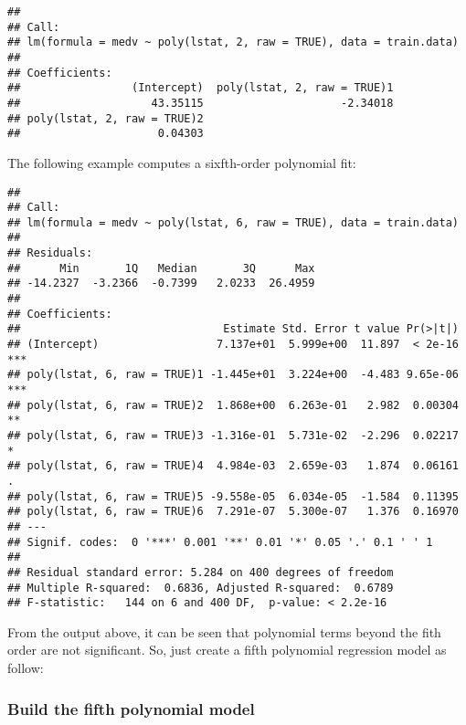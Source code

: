 \documentclass[]{article}
\newenvironment{Shaded}{\begin{snugshade}}{\end{snugshade}}
\newcommand{\DataTypeTok}[1]{\textcolor[rgb]{0.13,0.29,0.53}{#1}}
\newcommand{\DecValTok}[1]{\textcolor[rgb]{0.00,0.00,0.81}{#1}}
\newcommand{\KeywordTok}[1]{\textcolor[rgb]{0.13,0.29,0.53}{\textbf{#1}}}
\newcommand{\NormalTok}[1]{#1}
\newcommand{\OperatorTok}[1]{\textcolor[rgb]{0.81,0.36,0.00}{\textbf{#1}}}
\newcommand{\OtherTok}[1]{\textcolor[rgb]{0.56,0.35,0.01}{#1}}
\newcommand{\StringTok}[1]{\textcolor[rgb]{0.31,0.60,0.02}{#1}}
\begin{document}
\begin{verbatim}
## 
## Call:
## lm(formula = medv ~ poly(lstat, 2, raw = TRUE), data = train.data)
## 
## Coefficients:
##                 (Intercept)  poly(lstat, 2, raw = TRUE)1  
##                    43.35115                     -2.34018  
## poly(lstat, 2, raw = TRUE)2  
##                     0.04303
\end{verbatim}

The following example computes a sixfth-order polynomial fit:

\begin{Shaded}
\end{Shaded}

\begin{verbatim}
## 
## Call:
## lm(formula = medv ~ poly(lstat, 6, raw = TRUE), data = train.data)
## 
## Residuals:
##      Min       1Q   Median       3Q      Max 
## -14.2327  -3.2366  -0.7399   2.0233  26.4959 
## 
## Coefficients:
##                               Estimate Std. Error t value Pr(>|t|)    
## (Intercept)                  7.137e+01  5.999e+00  11.897  < 2e-16 ***
## poly(lstat, 6, raw = TRUE)1 -1.445e+01  3.224e+00  -4.483 9.65e-06 ***
## poly(lstat, 6, raw = TRUE)2  1.868e+00  6.263e-01   2.982  0.00304 ** 
## poly(lstat, 6, raw = TRUE)3 -1.316e-01  5.731e-02  -2.296  0.02217 *  
## poly(lstat, 6, raw = TRUE)4  4.984e-03  2.659e-03   1.874  0.06161 .  
## poly(lstat, 6, raw = TRUE)5 -9.558e-05  6.034e-05  -1.584  0.11395    
## poly(lstat, 6, raw = TRUE)6  7.291e-07  5.300e-07   1.376  0.16970    
## ---
## Signif. codes:  0 '***' 0.001 '**' 0.01 '*' 0.05 '.' 0.1 ' ' 1
## 
## Residual standard error: 5.284 on 400 degrees of freedom
## Multiple R-squared:  0.6836, Adjusted R-squared:  0.6789 
## F-statistic:   144 on 6 and 400 DF,  p-value: < 2.2e-16
\end{verbatim}

From the output above, it can be seen that polynomial terms beyond the
fith order are not significant. So, just create a fifth polynomial
regression model as follow:

\hypertarget{build-the-fifth-polynomial-model}{%
\subsubsection{Build the fifth polynomial
model}\label{build-the-fifth-polynomial-model}}
\end{document}
